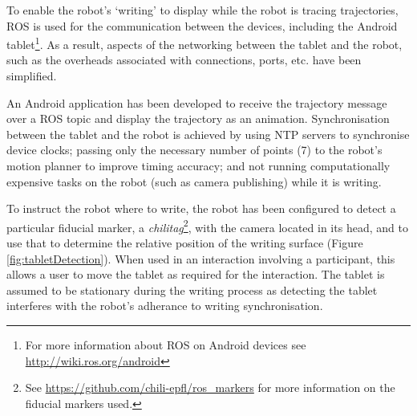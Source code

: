 \documentclass{sig-alternate}
\begin{document}

To enable the robot's `writing' to display while the robot is tracing
trajectories, ROS is used for the communication between the devices, including
the Android tablet\footnote{For more information about ROS on Android devices
see \url{http://wiki.ros.org/android}}. As a result, aspects of the networking
between the tablet and the robot, such as the overheads associated with
connections, ports, etc. have been simplified. 

An Android application has been developed to receive the trajectory message over
a ROS topic and display the trajectory as an animation. Synchronisation between
the tablet and the robot is achieved by using NTP servers to synchronise device
clocks; passing only the necessary number of points (7) to the robot's motion
planner to improve timing accuracy; and not running computationally expensive
tasks on the robot (such as camera publishing) while it is writing.







To instruct the robot where to write, the robot has been configured to detect a
particular fiducial marker, a \emph{chilitag}\footnote{See
\url{https://github.com/chili-epfl/ros_markers} for more information on the
fiducial markers used.}, with the camera located in its head, and to use that to
determine the relative position of the writing surface (Figure
\ref{fig:tabletDetection}). When used in an interaction involving a participant,
this allows a user to move the tablet as required for the interaction. The
tablet is assumed to be stationary during the writing process as detecting the
tablet interferes with the robot's adherance to writing synchronisation.
\end{document}
